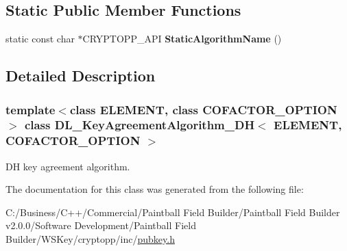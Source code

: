 \subsection*{Static Public Member Functions}
\begin{DoxyCompactItemize}
\item 
\hypertarget{class_d_l___key_agreement_algorithm___d_h_a504c08b110cc3cdfd0820c4c346672ac}{
static const char $\ast$CRYPTOPP\_\-API {\bfseries StaticAlgorithmName} ()}
\label{class_d_l___key_agreement_algorithm___d_h_a504c08b110cc3cdfd0820c4c346672ac}

\end{DoxyCompactItemize}


\subsection{Detailed Description}
\subsubsection*{template$<$class ELEMENT, class COFACTOR\_\-OPTION$>$ class DL\_\-KeyAgreementAlgorithm\_\-DH$<$ ELEMENT, COFACTOR\_\-OPTION $>$}

DH key agreement algorithm. 

The documentation for this class was generated from the following file:\begin{DoxyCompactItemize}
\item 
C:/Business/C++/Commercial/Paintball Field Builder/Paintball Field Builder v2.0.0/Software Development/Paintball Field Builder/WSKey/cryptopp/inc/\hyperlink{pubkey_8h}{pubkey.h}\end{DoxyCompactItemize}
